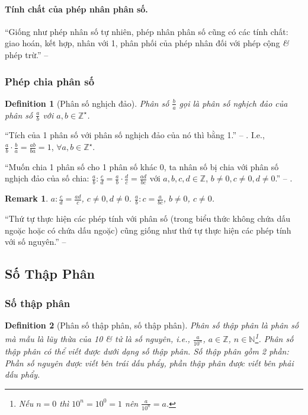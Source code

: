 \documentclass{article}
\numberwithin{equation}{section}
\newtheorem{definition}{Definition}[section]
\newtheorem{remark}{Remark}[section]
\begin{document}
\paragraph{Tính chất của phép nhân phân số.} ``Giống như phép nhân số tự nhiên, phép nhân phân số cũng có các tính chất: giao hoán, kết hợp, nhân với 1, phân phối của phép nhân đối với phép cộng \textit{\&} phép trừ.'' -- \cite[p. 41]{Thai_Anh_Dat_Ha_Loan_Nam_Quang_Toan_6_tap_2}

\subsubsection{Phép chia phân số}
 
\begin{definition}[Phân số nghịch đảo]
	Phân số $\frac{b}{a}$ gọi là \emph{phân số nghịch đảo} của phân số $\frac{a}{b}$ với $a,b\in\mathbb{Z}^\star$.
\end{definition}
``Tích của 1 phân số với phân số nghịch đảo của nó thì bằng 1.'' -- \cite[p. 42]{Thai_Anh_Dat_Ha_Loan_Nam_Quang_Toan_6_tap_2}. I.e., $\frac{a}{b}\cdot\frac{b}{a} = \frac{ab}{ba} = 1$, $\forall a,b\in\mathbb{Z}^\star$.

``Muốn chia 1 phân số cho 1 phân số khác 0, ta nhân số bị chia với phân số nghịch đảo của số chia: $\frac{a}{b}:\frac{c}{d} = \frac{a}{b}\cdot\frac{d}{c} = \frac{ad}{bc}$ với $a,b,c,d\in\mathbb{Z}$, $b\ne 0,c\ne 0,d\ne 0$.'' -- \cite[p. 42]{Thai_Anh_Dat_Ha_Loan_Nam_Quang_Toan_6_tap_2}.

\begin{remark}
	$a:\frac{c}{d} = \frac{ad}{c}$, $c\ne 0,d\ne 0$. $\frac{a}{b}:c = \frac{a}{bc}$, $b\ne 0$, $c\ne 0$.
\end{remark}
``Thứ tự thực hiện các phép tính với phân số (trong biểu thức không chứa dấu ngoặc hoặc có chứa dấu ngoặc) cũng giống như thứ tự thực hiện các phép tính với số nguyên.'' -- \cite[p. 42]{Thai_Anh_Dat_Ha_Loan_Nam_Quang_Toan_6_tap_2}

\subsection{Số Thập Phân}

\subsubsection{Số thập phân}

\begin{definition}[Phân số thập phân, số thập phân]
	\emph{Phân số thập phân} là phân số mà mẫu là lũy thừa của 10 \textit{\&} tử là số nguyên, i.e., $\frac{a}{10^n}$, $a\in\mathbb{Z}$, $n\in\mathbb{N}$\footnote{Nếu $n = 0$ thì $10^n = 10^0 = 1$ nên $\frac{a}{10^n} = a$.}. Phân số thập phân có thể viết được dưới dạng số thập phân. Số thập phân gồm 2 phần: \emph{Phần số nguyên} được viết bên trái dấu phẩy, \emph{phần thập phân} được viết bên phải dấu phẩy.
\end{definition}
\end{document}
